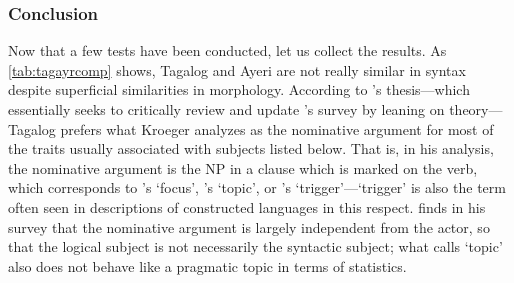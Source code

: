 \subsubsection{Conclusion}

Now that a few tests have been conducted, let us collect the results. As
\autoref{tab:tagayrcomp} shows, Tagalog and Ayeri are not really similar in
syntax despite superficial similarities in morphology. According to
\citet{kroeger1991}'s thesis---which essentially seeks to critically review and
update \citet{schachter1976}'s survey by leaning on \Lfg{} theory---Tagalog
prefers what Kroeger analyzes as the nominative argument for most of the traits
usually associated with subjects listed below. That is, in his analysis, the
nominative argument is the NP in a clause which is marked on the verb, which
corresponds to \citet{schachterotanes1972}'s `focus', \citet{schachter1976}'s
`topic', or \citet{schachter2015}'s `trigger'---`trigger' is also the term
often seen in descriptions of constructed languages in this respect.
\citet{kroeger1991} finds in his survey that the nominative argument is largely
independent from the actor, so that the logical subject is not necessarily the
syntactic subject; what \citet{schachter1976} calls `topic' also does not
behave like a pragmatic topic in terms of statistics.

